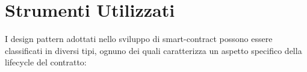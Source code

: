\chapter{Strumenti Utilizzati}
I design pattern adottati nello sviluppo di smart-contract possono essere classificati in diversi tipi\cite[alcuni tipi]{9089272}\cite{9050163}, ognuno dei quali caratterizza un aspetto specifico della lifecycle del contratto: